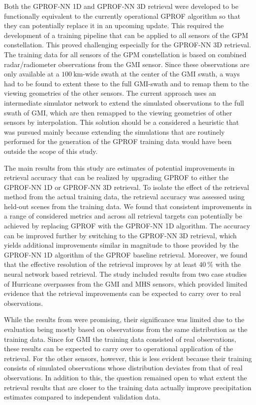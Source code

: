 Both the GPROF-NN 1D and GPROF-NN 3D retrieval were developed to be functionally
equivalent to the currently operational GPROF algorithm so that they can
potentially replace it in an upcoming update. This required the development of a
training pipeline that can be applied to all sensors of the GPM constellation.
This proved challenging especially for the GPROF-NN 3D retrieval. The training
data for all sensors of the GPM constellation is based on combined
radar/radiometer observations from the GMI sensor. Since these observations are
only available at a $\SI{100}{\kilo \meter}$-wide swath at the center of the GMI
swath, a ways had to be found to extent these to the full GMI-swath and to remap
them to the viewing geometries of the other sensors. The current approach uses
an intermediate simulator network to extend the simulated observations to the
full swath of GMI, which are then remapped to the viewing geometries of other
sensors by interpolation. This solution should be a considered a heuristic that
was pursued mainly because extending the simulations that are routinely performed
for the generation of the GPROF training data would have been outside the
scope of this study.

The main results from this study are estimates of potential improvements in
retrieval accuracy that can be realized by upgrading GPROF to either the
GPROF-NN 1D or GPROF-NN 3D retrieval. To isolate the effect of the retrieval
method from the actual training data, the retrieval accuracy was assessed using
held-out scenes from the training data. We found that consistent improvements in
a range of considered metrics and across all retrieval targets can potentially
be achieved by replacing GPROF with the GPROF-NN 1D algorithm. The accuracy
can be improved further by switching to the GPROF-NN 3D retrieval, which yields
additional improvements similar in magnitude to those provided by the GPROF-NN 1D
algorithm of the GPROF baseline retrieval. Moreover, we found that the effective
resolution of the retrieval improves by at least $\SI{40}{\percent}$ with the
neural network based retrieval. The study included results from two case studies
of Hurricane overpasses from the GMI and MHS sensors, which provided limited
evidence that the retrieval improvements can be expected to carry over to real
observations.

While the results from \citet{pfreundschuh22} were promising, their significance
was limited due to the evaluation being mostly based on observations from the
same distribution as the training data. Since for GMI the training data
consisted of real observations, these results can be expected to carry over to
operational application of the retrieval. For the other sensors, however, this
is less evident because their training consists of simulated observations whose
distribution deviates from that of real observations. In addition to this, the
question remained open to what extent the retrieval results that are closer to
the training data actually improve precipitation estimates compared to
independent validation data.


